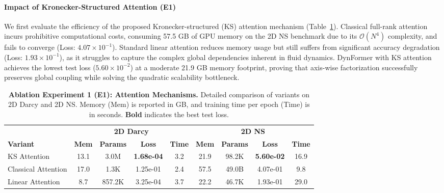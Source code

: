 \documentclass[final,3p,times]{elsarticle}
\begin{document}
\paragraph{Impact of Kronecker-Structured Attention (E1)}
We first evaluate the efficiency of the proposed Kronecker-structured (KS) attention mechanism (Table~\ref{tab:ablation_e1}). Classical full-rank attention incurs prohibitive computational costs, consuming 57.5 GB of GPU memory on the 2D NS benchmark due to its $\mathcal{O}(N^4)$ complexity, and fails to converge (Loss: $4.07 \times 10^{-1}$). Standard linear attention reduces memory usage but still suffers from significant accuracy degradation (Loss: $1.93 \times 10^{-1}$), as it struggles to capture the complex global dependencies inherent in fluid dynamics. DynFormer with KS attention achieves the lowest test loss ($5.60 \times 10^{-2}$) at a moderate 21.9 GB memory footprint, proving that axis-wise factorization successfully preserves global coupling while solving the quadratic scalability bottleneck.
\begin{table}[htbp]
  \centering
  \small
  \setlength{\tabcolsep}{4pt}
  \renewcommand{\arraystretch}{1.2}
  \caption{\textbf{Ablation Experiment 1 (E1): Attention Mechanisms.} Detailed comparison of variants on 2D Darcy and 2D NS. Memory (Mem) is reported in GB, and training time per epoch (Time) is in seconds. \textbf{Bold} indicates the best test loss.}
  \label{tab:ablation_e1}
  \begin{tabular}{l c c c c c c c c}
    \toprule
    & \multicolumn{4}{c}{\textbf{2D Darcy}} & \multicolumn{4}{c}{\textbf{2D NS}} \\
    \cmidrule(lr){2-5} \cmidrule(lr){6-9}
    \textbf{Variant} & \textbf{Mem} & \textbf{Params} & {\textbf{Loss}} & \textbf{Time} & \textbf{Mem} & \textbf{Params} & {\textbf{Loss}} & \textbf{Time} \\
    \midrule
    KS Attention & 13.1 & 3.0M & \textbf{1.68e-04} & 3.2 & 21.9 & 98.2K & \textbf{5.60e-02} & 16.9 \\
    Classical Attention & 17.0 & 1.3K & 1.25e-01 & 2.4 & 57.5 & 49.0B & 4.07e-01 & 9.8 \\
    Linear Attention & 8.7 & 857.2K & 3.25e-04 & 3.7 & 22.2 & 46.7K & 1.93e-01 & 29.0 \\
    \bottomrule
  \end{tabular}
\end{table}
\end{document}
